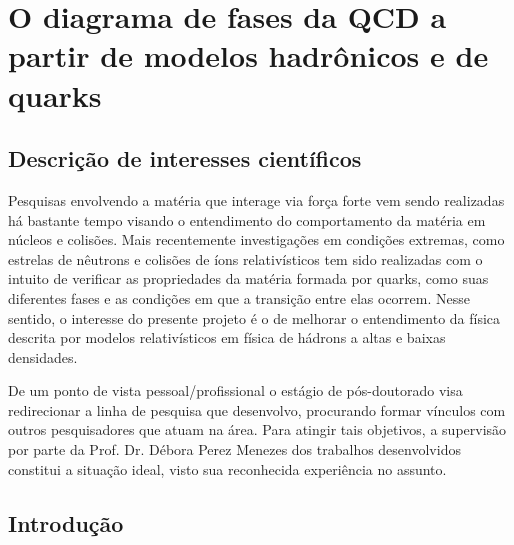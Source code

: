 \chapter{O diagrama de fases da QCD a partir de modelos hadrônicos e de quarks}

\section*{Descrição de interesses científicos}

Pesquisas envolvendo a matéria que interage via força forte vem sendo realizadas há bastante tempo visando o entendimento do comportamento da matéria em núcleos e colisões. Mais recentemente investigações em condições extremas, como estrelas de nêutrons e colisões de íons relativísticos tem sido realizadas com o intuito de verificar as propriedades da matéria formada por quarks, como suas diferentes fases e as condições em que a transição entre elas ocorrem. Nesse sentido, o interesse do presente projeto é o de melhorar o entendimento da física descrita por modelos relativísticos em física de hádrons a altas e baixas densidades.

De um ponto de vista pessoal/profissional o estágio de pós-doutorado visa redirecionar a linha de pesquisa que desenvolvo, procurando formar vínculos com outros pesquisadores que atuam na área. Para atingir tais objetivos, a supervisão por parte da Prof\textordfeminine. Dr\textordfeminine. Débora Perez Menezes dos trabalhos desenvolvidos constitui a situação ideal, visto sua reconhecida experiência no assunto.

\section{Introdução}




